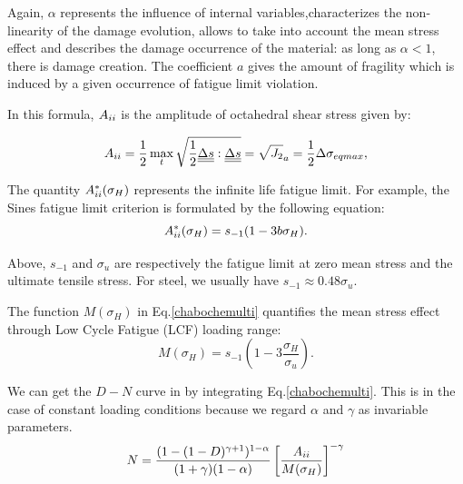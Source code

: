 Again, $\alpha$ represents the influence of internal variables,characterizes the non-linearity of the damage evolution, allows to take into account the mean stress effect and describes the damage occurrence of the material: as long as $\alpha < 1$, there is damage creation. The coefficient $a$ gives the amount of fragility which is induced by a given occurrence of fatigue limit violation.

In this formula, $A_{\uppercase\expandafter{\romannumeral2}}$ is the amplitude of octahedral shear stress given by:

\begin{equation}A_{\uppercase\expandafter{\romannumeral2}}=\frac{1}{2}\max\limits_{t}\sqrt{\frac{1}{2}\uline{\uline{\Delta s}}:\uline{\uline{\Delta s}}}=\sqrt{J_2}_a=\frac{1}{2}\Delta\sigma_{eqmax},\end{equation}

The quantity $A_{\uppercase\expandafter{\romannumeral2}}^\ast(\sigma_H)$ represents the infinite life fatigue limit. For example, the Sines fatigue limit criterion is formulated by the following equation:
\begin{equation} A_{\uppercase\expandafter{\romannumeral2}}^\ast(\sigma_H)=s_{-1}(1-3b\sigma_H).\end{equation}

Above, $s_{-1}$ and $\sigma_{u}$ are respectively the fatigue limit at zero mean stress and the ultimate tensile stress. For steel, we usually have $s_{-1}\approx 0.48\sigma_{u}$.

The function $M(\sigma_H)$ in Eq.\eqref{chabochemulti} quantifies the mean stress effect through Low Cycle Fatigue (LCF) loading range:
$$M(\sigma_H)=s_{-1}\left(1-3\frac{\sigma_H}{\sigma_u}\right).$$

We can get the $D-N$ curve in  by integrating Eq.\eqref{chabochemulti}. This is in the case of constant loading conditions because we regard $\alpha$ and $\gamma$ as invariable parameters.
\begin{equation}N =\frac{( 1 -(1-D)^{\gamma+1})^{1-\alpha}}{(1+\gamma)(1-\alpha)}\left[\frac{A_{\uppercase\expandafter{\romannumeral2}}}{M(\sigma_H)}\right]^{-\gamma} 
\label{D-N}
\end{equation} 

